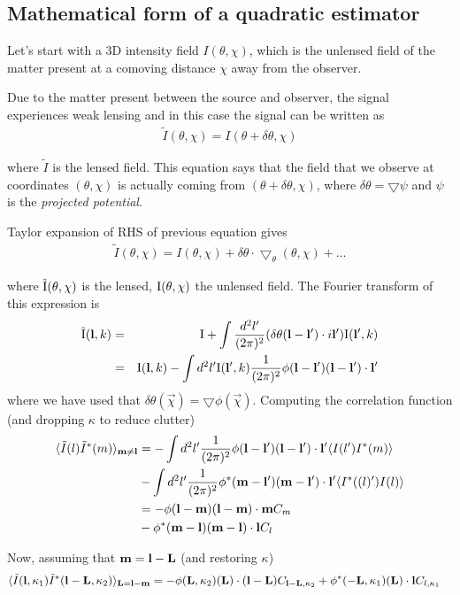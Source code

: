 \documentclass[12pt]{article}
\newcommand{\beq}{\begin{equation}}
\newcommand{\eeq}{\end{equation}}
\newcommand{\beqa}{\begin{eqnarray}}
\newcommand{\eeqa}{\end{eqnarray}}
\newcommand{\beqal}{\begin{aligned}}
\newcommand{\eeqal}{\end{aligned}}
\def\l{{\bf l}}
\def\L{{\bf L}}
\def\iul{{\rm I}}
\def\il{{\tilde{\rm I}}}
\def\dtheta{\delta \theta}
\numberwithin{equation}{section}
\begin{document}
\subsection{Mathematical form of a quadratic estimator}
Let's start with a 3D intensity field $I(\theta, \chi)$, which is the unlensed field of the matter present at a comoving distance $\chi$ away from the observer. 

Due to the matter present between the source and observer, the signal experiences weak lensing and in this case the signal can be written as
\beqa
\tilde{I}(\theta,\chi) = I(\theta + \delta\theta, \chi )
\eeqa

where $\tilde{I}$ is the lensed field. This equation says that the field that we observe at coordinates $(\theta,\chi)$ is actually coming from $(\theta + \delta\theta, \chi)$, where $\delta\theta = \bigtriangledown\psi$ and $\psi$ is the \textit{projected potential}. 

Taylor expansion of RHS of previous equation gives
\beqa
\tilde{I}(\theta,\chi) = I(\theta,\chi) + \delta\theta \cdot \bigtriangledown_\theta (\theta, \chi) + \ldots
\eeqa


where $\il(\theta,\chi)$ is the lensed, $\iul(\theta,\chi)$ the unlensed
field. The Fourier transform of this expression is
\begin{eqnarray}
\il(\l,k) &=& \iul+\int \frac{d^2l'}{(2\pi)^2}(\delta\theta
(\l-\l')\cdot i\l')\iul(\l',k) \\
&=& \iul(\l, k) - \int {d^2l'} \iul(\l',k) \frac{1}{(2\pi)^2}\phi(\l-\l')(\l-\l')\cdot
\l'
\end{eqnarray}
where we have used that $\dtheta(\vec{\chi})=\bigtriangledown \phi(\vec{\chi})$.
Computing the correlation function (and dropping $ \kappa $ to reduce clutter)
\beq
\beqal
\langle \tilde I (l) \tilde{I}^*(m) \rangle _{\textbf{m} \neq \textbf{l}} &= - \int {d^2 l'}  \frac{1}{(2\pi)^2}\phi(\l-\l')(\l-\l')\cdot \l'  \langle I(l^\prime) I^*(m)  \rangle 
\\
& -  \int {d^2 l'}  \frac{1}{(2\pi)^2}\phi^*(\textbf{m}-\l')(\textbf{m}-\l')\cdot \l'  \langle I^*((l)^\prime) I(l) \rangle
 \\
 &= -  \phi(\l-\textbf{m})(\l-\textbf{m})\cdot \textbf{m}  C_m 
 \\
&  -   \phi^*(\textbf{m}-\l)(\textbf{m}-\l)\cdot \l  C_l
\eeqal
\eeq

Now, assuming that $ \textbf{m} = \l- \L $ (and restoring $ \kappa $)
\beq
\beqal
\langle \tilde I (\l, \kappa_1) \tilde{I}^*(\l - \L, \kappa_2) \rangle _{\textbf{L}  = \l - \textbf{m}} &= -  \phi(\L, \kappa_2)(\L)\cdot (\textbf{l} - \textbf{L})  C_{\l - \L, \kappa_2} +   \phi^*(-\L, \kappa_1)(\L)\cdot \l  C_{l, \kappa_1}
\eeqal
\eeq
\end{document}
